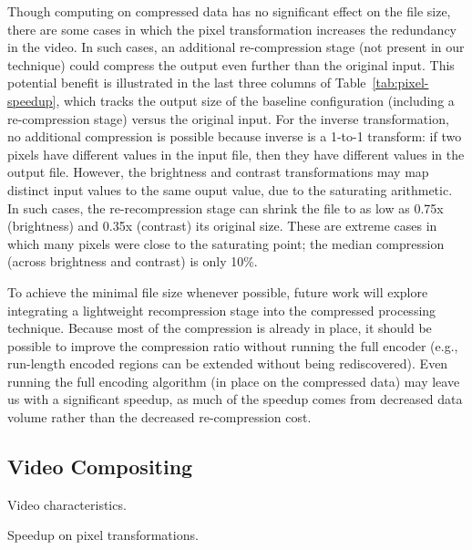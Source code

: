 Though computing on compressed data has no significant effect on the
file size, there are some cases in which the pixel transformation
increases the redundancy in the video.  In such cases, an additional
re-compression stage (not present in our technique) could compress the
output even further than the original input.  This potential benefit
is illustrated in the last three columns of
Table~\ref{tab:pixel-speedup}, which tracks the output size of the
baseline configuration (including a re-compression stage) versus the
original input.  For the inverse transformation, no additional
compression is possible because inverse is a 1-to-1 transform: if two
pixels have different values in the input file, then they have
different values in the output file.  However, the brightness and
contrast transformations may map distinct input values to the same
ouput value, due to the saturating arithmetic.  In such cases, the
re-recompression stage can shrink the file to as low as 0.75x
(brightness) and 0.35x (contrast) its original size.  These are
extreme cases in which many pixels were close to the saturating point;
the median compression (across brightness and contrast) is only 10\%.

To achieve the minimal file size whenever possible, future work will
explore integrating a lightweight recompression stage into the
compressed processing technique.  Because most of the compression is
already in place, it should be possible to improve the compression
ratio without running the full encoder (e.g., run-length encoded
regions can be extended without being rediscovered).  Even running the
full encoding algorithm (in place on the compressed data) may leave us
with a significant speedup, as much of the speedup comes from
decreased data volume rather than the decreased re-compression cost.

\subsection{Video Compositing}




\begin{table*}[t]
\caption{Video characteristics.
\protect\label{tab:videos}}
\end{table*}

\begin{table*}[t]
\caption{Speedup on pixel transformations.
\protect\label{tab:pixel-speedup}}
\end{table*}

